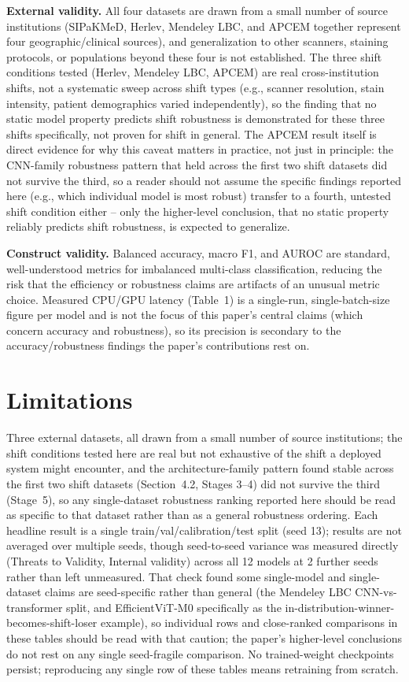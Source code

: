 \documentclass[runningheads]{llncs}
\begin{document}
\textbf{External validity.} All four datasets are drawn from a small
number of source institutions (SIPaKMeD, Herlev, Mendeley LBC, and APCEM
together represent four geographic/clinical sources), and generalization
to other scanners, staining protocols, or populations beyond these four is
not established. The three shift conditions tested (Herlev, Mendeley LBC,
APCEM) are real cross-institution shifts, not a systematic sweep across
shift types (e.g., scanner resolution, stain intensity, patient
demographics varied independently), so the finding that no static model
property predicts shift robustness is demonstrated for these three shifts
specifically, not proven for shift in general. The APCEM result itself is
direct evidence for why this caveat matters in practice, not just in
principle: the CNN-family robustness pattern that held across the first
two shift datasets did not survive the third, so a reader should not
assume the specific findings reported here (e.g., which individual model
is most robust) transfer to a fourth, untested shift condition either --
only the higher-level conclusion, that no static property reliably
predicts shift robustness, is expected to generalize.

\textbf{Construct validity.} Balanced accuracy, macro F1, and AUROC are
standard, well-understood metrics for imbalanced multi-class
classification, reducing the risk that the efficiency or robustness
claims are artifacts of an unusual metric choice. Measured CPU/GPU
latency (Table~1) is a single-run, single-batch-size figure per model and
is not the focus of this paper's central claims (which concern accuracy
and robustness), so its precision is secondary to the accuracy/robustness
findings the paper's contributions rest on.

\section{Limitations}

Three external datasets, all drawn from a small number of source
institutions; the shift conditions tested here are real but not
exhaustive of the shift a deployed system might encounter, and the
architecture-family pattern found stable across the first two shift
datasets (Section~4.2, Stages 3--4) did not survive the third (Stage~5),
so any single-dataset robustness ranking reported here should be read as
specific to that dataset rather than as a general robustness ordering. Each
headline result is a single train/val/calibration/test split (seed 13);
results are not averaged over multiple seeds, though seed-to-seed variance
was measured directly (Threats to Validity, Internal validity) across all
12 models at 2 further seeds rather than left unmeasured. That check found
some single-model and single-dataset claims are seed-specific rather than
general (the Mendeley LBC CNN-vs-transformer split, and EfficientViT-M0
specifically as the in-distribution-winner-becomes-shift-loser example),
so individual rows and close-ranked comparisons in these tables should be
read with that caution; the paper's higher-level conclusions do not rest
on any single seed-fragile comparison. No trained-weight checkpoints
persist; reproducing any single row of these tables means retraining from
scratch.
\end{document}
